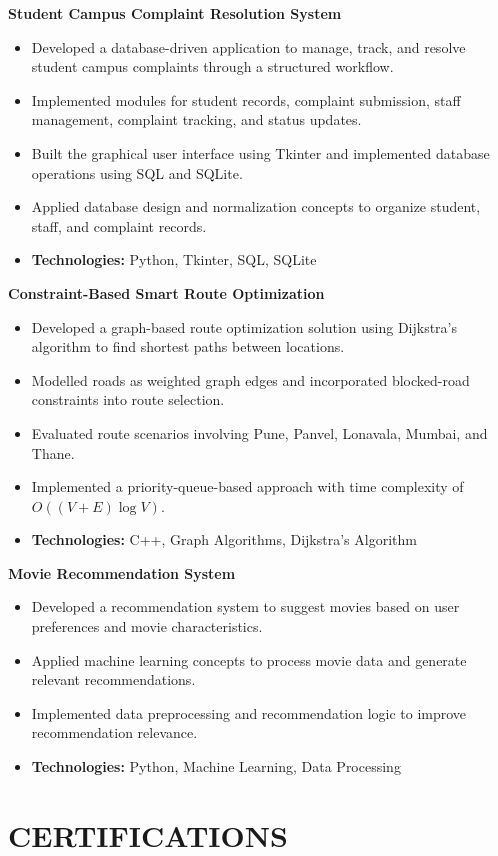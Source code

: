 \documentclass[10pt,a4paper]{article}
\begin{document}
\textbf{Student Campus Complaint Resolution System}
\begin{itemize}
\item Developed a database-driven application to manage, track, and resolve student campus complaints through a structured workflow.
\item Implemented modules for student records, complaint submission, staff management, complaint tracking, and status updates.
\item Built the graphical user interface using Tkinter and implemented database operations using SQL and SQLite.
\item Applied database design and normalization concepts to organize student, staff, and complaint records.
\item \textbf{Technologies:} Python, Tkinter, SQL, SQLite
\end{itemize}

\textbf{Constraint-Based Smart Route Optimization}
\begin{itemize}
\item Developed a graph-based route optimization solution using Dijkstra's algorithm to find shortest paths between locations.
\item Modelled roads as weighted graph edges and incorporated blocked-road constraints into route selection.
\item Evaluated route scenarios involving Pune, Panvel, Lonavala, Mumbai, and Thane.
\item Implemented a priority-queue-based approach with time complexity of $O((V+E)\log V)$.
\item \textbf{Technologies:} C++, Graph Algorithms, Dijkstra's Algorithm
\end{itemize}

\textbf{Movie Recommendation System}
\begin{itemize}
\item Developed a recommendation system to suggest movies based on user preferences and movie characteristics.
\item Applied machine learning concepts to process movie data and generate relevant recommendations.
\item Implemented data preprocessing and recommendation logic to improve recommendation relevance.
\item \textbf{Technologies:} Python, Machine Learning, Data Processing
\end{itemize}

\section*{CERTIFICATIONS}
\end{document}
